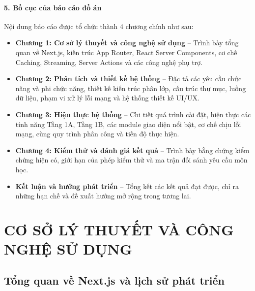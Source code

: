 \documentclass[12pt,a4paper]{extarticle}
\begin{document}
\paragraph*{5. Bố cục của báo cáo đồ án}
Nội dung báo cáo được tổ chức thành 4 chương chính như sau:
\begin{itemize}[noitemsep]
    \item \textbf{Chương 1: Cơ sở lý thuyết và công nghệ sử dụng} -- Trình bày tổng quan về Next.js, kiến trúc App Router, React Server Components, cơ chế Caching, Streaming, Server Actions và các công nghệ phụ trợ.
    \item \textbf{Chương 2: Phân tích và thiết kế hệ thống} -- Đặc tả các yêu cầu chức năng và phi chức năng, thiết kế kiến trúc phân lớp, cấu trúc thư mục, luồng dữ liệu, phạm vi xử lý lỗi mạng và hệ thống thiết kế UI/UX.
    \item \textbf{Chương 3: Hiện thực hệ thống} -- Chi tiết quá trình cài đặt, hiện thực các tính năng Tầng 1A, Tầng 1B, các module giao diện nổi bật, cơ chế chịu lỗi mạng, cùng quy trình phân công và tiến độ thực hiện.
    \item \textbf{Chương 4: Kiểm thử và đánh giá kết quả} -- Trình bày bằng chứng kiểm chứng hiện có, giới hạn của phép kiểm thử và ma trận đối sánh yêu cầu môn học.
    \item \textbf{Kết luận và hướng phát triển} -- Tổng kết các kết quả đạt được, chỉ ra những hạn chế và đề xuất hướng mở rộng trong tương lai.
\end{itemize}

\newpage
\section{CƠ SỞ LÝ THUYẾT VÀ CÔNG NGHỆ SỬ DỤNG}

\subsection{Tổng quan về Next.js và lịch sử phát triển}
\end{document}
